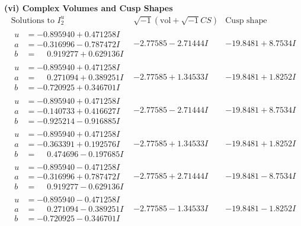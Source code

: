\documentclass[1p]{elsarticle_modified}
\theoremstyle{definition}
\newcommand{\I}{\sqrt{-1}}
\begin{document}
\newpage\flushleft \textbf{(vi) Complex Volumes and Cusp Shapes}
$$\begin{array}{c|c|c}  
\text{Solutions to }I^u_{2}& \I (\text{vol} + \sqrt{-1}CS) & \text{Cusp shape}\\
 \hline 
\begin{aligned}
u &= -0.895940 + 0.471258 I \\
a &= -0.316996 - 0.787472 I \\
b &= \phantom{-}0.919277 + 0.629136 I\end{aligned}
 & -2.77585 - 2.71444 I & -19.8481 + 8.7534 I \\ \hline\begin{aligned}
u &= -0.895940 + 0.471258 I \\
a &= \phantom{-}0.271094 + 0.389251 I \\
b &= -0.720925 + 0.346701 I\end{aligned}
 & -2.77585 + 1.34533 I & -19.8481 + 1.8252 I \\ \hline\begin{aligned}
u &= -0.895940 + 0.471258 I \\
a &= -0.140733 + 0.416627 I \\
b &= -0.925214 - 0.916885 I\end{aligned}
 & -2.77585 - 2.71444 I & -19.8481 + 8.7534 I \\ \hline\begin{aligned}
u &= -0.895940 + 0.471258 I \\
a &= -0.363391 + 0.192576 I \\
b &= \phantom{-}0.474696 - 0.197685 I\end{aligned}
 & -2.77585 + 1.34533 I & -19.8481 + 1.8252 I \\ \hline\begin{aligned}
u &= -0.895940 - 0.471258 I \\
a &= -0.316996 + 0.787472 I \\
b &= \phantom{-}0.919277 - 0.629136 I\end{aligned}
 & -2.77585 + 2.71444 I & -19.8481 - 8.7534 I \\ \hline\begin{aligned}
u &= -0.895940 - 0.471258 I \\
a &= \phantom{-}0.271094 - 0.389251 I \\
b &= -0.720925 - 0.346701 I\end{aligned}
 & -2.77585 - 1.34533 I & -19.8481 - 1.8252 I \\ \hline\begin{aligned}

\end{aligned}
\end{array}$$
\end{document}
